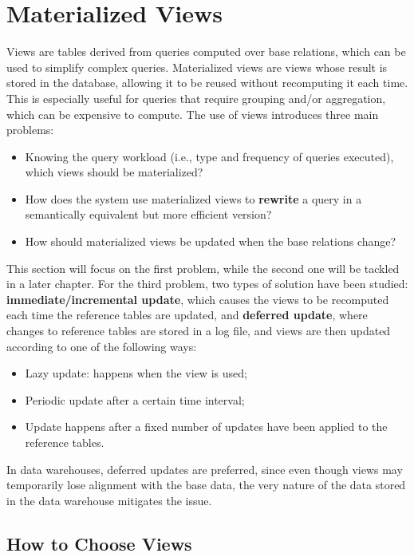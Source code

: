 \section{Materialized Views}

Views are tables derived from queries computed over base relations, which can be used to simplify complex queries. Materialized views are views whose result is stored in the database, allowing it to be reused without recomputing it each time. This is especially useful for queries that require grouping and/or aggregation, which can be expensive to compute. The use of views introduces three main problems:
\begin{itemize}
    \item Knowing the query workload (i.e., type and frequency of queries executed), which views should be materialized? 
    \item How does the system use materialized views to \textbf{rewrite} a query in a semantically equivalent but more efficient version?
    \item How should materialized views be updated when the base relations change?
\end{itemize}
This section will focus on the first problem, while the second one will be tackled in a later chapter. For the third problem, two types of solution have been studied: \textbf{immediate/incremental update}, which causes the views to be recomputed each time the reference tables are updated, and \textbf{deferred update}, where changes to reference tables are stored in a log file, and views are then updated according to one of the following ways:
\begin{itemize}
    \item Lazy update: happens when the view is used;
    \item Periodic update after a certain time interval;
    \item Update happens after a fixed number of updates have been applied to the reference tables.
\end{itemize}
In data warehouses, deferred updates are preferred, since even though views may temporarily lose alignment with the base data, the very nature of the data stored in the data warehouse mitigates the issue.

\subsection{How to Choose Views}

